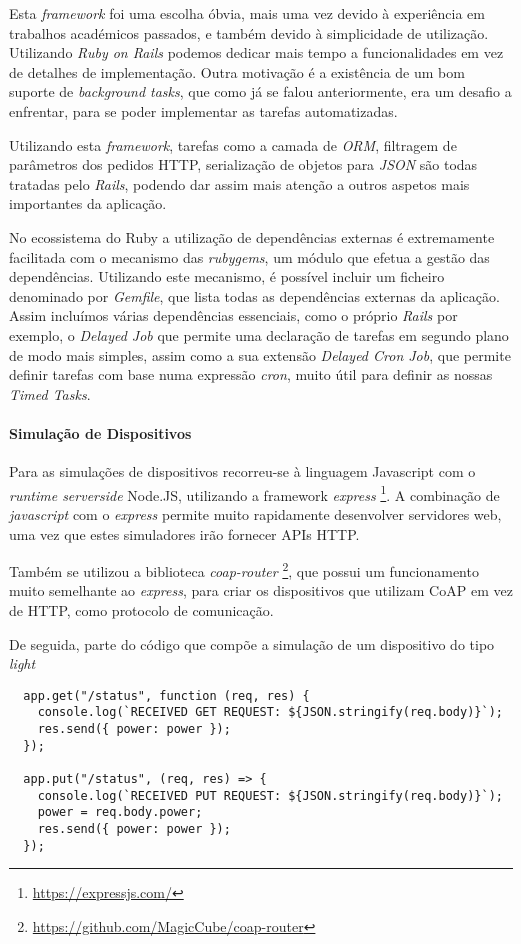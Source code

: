 Esta \textit{framework} foi uma escolha óbvia, mais uma vez devido à experiência em trabalhos académicos passados, e também devido à simplicidade de utilização. Utilizando \textit{Ruby on Rails} podemos dedicar mais tempo a funcionalidades em vez de detalhes de implementação. Outra motivação é a existência de um bom suporte de \textit{background tasks}, que como já se falou anteriormente, era um desafio a enfrentar, para se poder implementar as tarefas automatizadas.

Utilizando esta \textit{framework}, tarefas como a camada de \textit{ORM}, filtragem de parâmetros dos pedidos HTTP, serialização de objetos para \textit{JSON} são todas tratadas pelo \textit{Rails}, podendo dar assim mais atenção a outros aspetos mais importantes da aplicação.

No ecossistema do Ruby a utilização de dependências externas é extremamente facilitada com o mecanismo das \textit{rubygems}, um módulo que efetua a gestão das dependências. Utilizando este mecanismo, é possível incluir um ficheiro denominado por \textit{Gemfile}, que lista todas as dependências externas da aplicação. Assim incluímos várias dependências essenciais, como o próprio \textit{Rails} por exemplo, o \textit{Delayed Job} que permite uma declaração de tarefas em segundo plano de modo mais simples, assim como a sua extensão \textit{Delayed Cron Job}, que permite definir tarefas com base numa expressão \textit{cron}, muito útil para definir as nossas \textit{Timed Tasks}.

\paragraph*{Simulação de Dispositivos}

Para as simulações de dispositivos recorreu-se à linguagem Javascript com o \textit{runtime serverside} Node.JS, utilizando a framework \textit{express} \footnote{\url{https://expressjs.com/}}. A combinação de \textit{javascript} com o \textit{express} permite muito rapidamente desenvolver servidores web, uma vez que estes simuladores irão fornecer APIs HTTP.

Também se utilizou a biblioteca \textit{coap-router} \footnote{\url{https://github.com/MagicCube/coap-router}}, que possui um funcionamento muito semelhante ao \textit{express}, para criar os dispositivos que utilizam CoAP em vez de HTTP, como protocolo de comunicação.

De seguida, parte do código que compõe a simulação de um dispositivo do tipo \textit{light}
\begin{verbatim}
  app.get("/status", function (req, res) {
    console.log(`RECEIVED GET REQUEST: ${JSON.stringify(req.body)}`);
    res.send({ power: power });
  });

  app.put("/status", (req, res) => {
    console.log(`RECEIVED PUT REQUEST: ${JSON.stringify(req.body)}`);
    power = req.body.power;
    res.send({ power: power });
  });
\end{verbatim}

